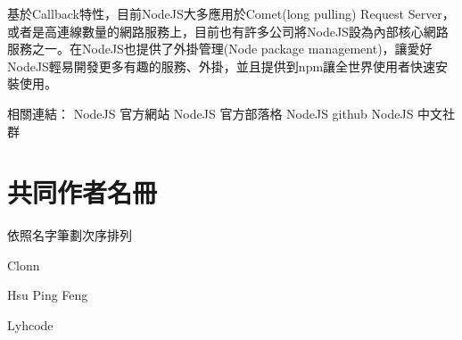 \documentclass[a4paper,12pt,english]{sphinxmanual}
\begin{document}
基於Callback特性，目前NodeJS大多應用於Comet(long pulling) Request Server，或者是高連線數量的網路服務上，目前也有許多公司將NodeJS設為內部核心網路服務之一。在NodeJS也提供了外掛管理(Node package management)，讓愛好NodeJS輕易開發更多有趣的服務、外掛，並且提供到npm讓全世界使用者快速安裝使用。

相關連結：
NodeJS 官方網站
NodeJS 官方部落格
NodeJS github
NodeJS 中文社群


\chapter{共同作者名冊}
\label{AUTHOR::doc}\label{AUTHOR:id1}
依照名字筆劃次序排列

Clonn

Hsu Ping Feng

Lyhcode



\renewcommand{\indexname}{Index}
\printindex
\end{document}
